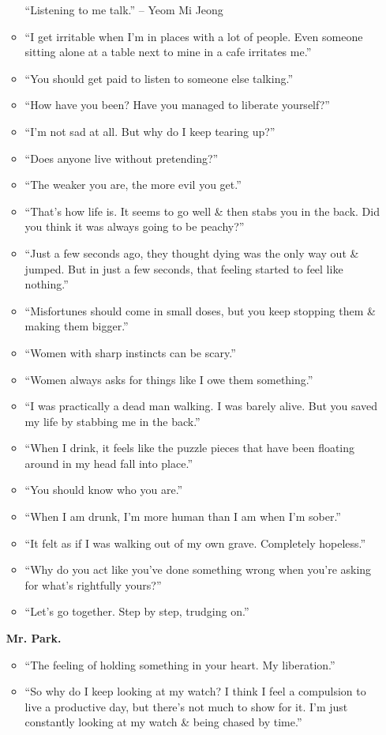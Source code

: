 \documentclass{article}
\begin{document}
\begin{enumerate}
\begin{itemize}
		``Listening to me talk.'' -- Yeom Mi Jeong
		\item ``I get irritable when I'm in places with a lot of people. Even someone sitting alone at a table next to mine in a cafe irritates me.''
		\item ``You should get paid to listen to someone else talking.''
		\item ``How have you been? Have you managed to liberate yourself?''
		\item ``I'm not sad at all. But why do I keep tearing up?''
		\item ``Does anyone live without pretending?''
		\item ``The weaker you are, the more evil you get.''
		\item ``That's how life is. It seems to go well \& then stabs you in the back. Did you think it was always going to be peachy?''
		\item ``Just a few seconds ago, they thought dying was the only way out \& jumped. But in just a few seconds, that feeling started to feel like nothing.''
		\item ``Misfortunes should come in small doses, but you keep stopping them \& making them bigger.''
		\item ``Women with sharp instincts can be scary.''
		\item ``Women always asks for things like I owe them something.''
		\item ``I was practically a dead man walking. I was barely alive. But you saved my life by stabbing me in the back.''
		\item ``When I drink, it feels like the puzzle pieces that have been floating around in my head fall into place.''
		\item ``You should know who you are.''
		\item ``When I am drunk, I'm more human than I am when I'm sober.''
		\item ``It felt as if I was walking out of my own grave. Completely hopeless.''
		\item ``Why do you act like you've done something wrong when you're asking for what's rightfully yours?''
		\item ``Let's go together. Step by step, trudging on.''
	\end{itemize}
	\textbf{Mr. Park.}
	\begin{itemize}
		\item ``The feeling of holding something in your heart. My liberation.''
		\item ``So why do I keep looking at my watch? I think I feel a compulsion to live a productive day, but there's not much to show for it. I'm just constantly looking at my watch \& being chased by time.''

\end{itemize}
\end{enumerate}
\end{document}
